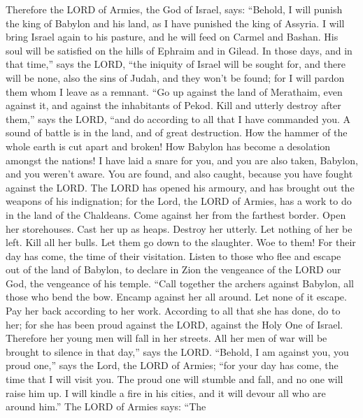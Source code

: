  Therefore the LORD of Armies, the God of Israel, says:
``Behold, I will punish the king of Babylon and his land, as I have
punished the king of Assyria.  I will bring Israel again
to his pasture, and he will feed on Carmel and Bashan. His soul will be
satisfied on the hills of Ephraim and in Gilead.  In
those days, and in that time,'' says the LORD, ``the iniquity of Israel
will be sought for, and there will be none, also the sins of Judah, and
they won't be found; for I will pardon them whom I leave as a remnant.
 ``Go up against the land of Merathaim, even against it,
and against the inhabitants of Pekod. Kill and utterly destroy after
them,'' says the LORD, ``and do according to all that I have commanded
you.  A sound of battle is in the land, and of great
destruction.  How the hammer of the whole earth is cut
apart and broken! How Babylon has become a desolation amongst the
nations!  I have laid a snare for you, and you are also
taken, Babylon, and you weren't aware. You are found, and also caught,
because you have fought against the LORD.  The LORD has
opened his armoury, and has brought out the weapons of his indignation;
for the Lord, the LORD of Armies, has a work to do in the land of the
Chaldeans.  Come against her from the farthest border.
Open her storehouses. Cast her up as heaps. Destroy her utterly. Let
nothing of her be left.  Kill all her bulls. Let them go
down to the slaughter. Woe to them! For their day has come, the time of
their visitation.  Listen to those who flee and escape
out of the land of Babylon, to declare in Zion the vengeance of the LORD
our God, the vengeance of his temple.  ``Call together
the archers against Babylon, all those who bend the bow. Encamp against
her all around. Let none of it escape. Pay her back according to her
work. According to all that she has done, do to her; for she has been
proud against the LORD, against the Holy One of Israel. 
Therefore her young men will fall in her streets. All her men of war
will be brought to silence in that day,'' says the LORD. 
``Behold, I am against you, you proud one,'' says the Lord, the LORD of
Armies; ``for your day has come, the time that I will visit you.
 The proud one will stumble and fall, and no one will
raise him up. I will kindle a fire in his cities, and it will devour all
who are around him.''  The LORD of Armies says: ``The
